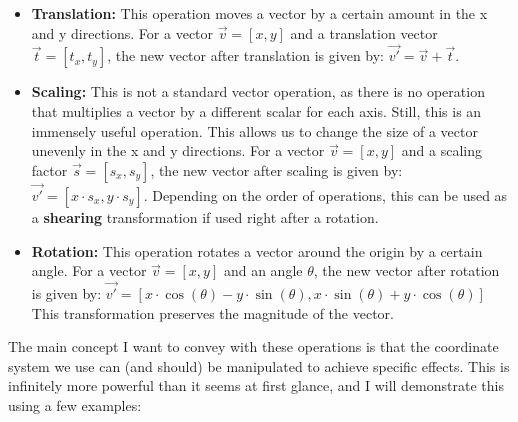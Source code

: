 \begin{itemize}
    \item \textbf{Translation:} This operation moves a vector by a certain amount in the x and y directions. For a vector \(\vec{v} = [x, y]\) and a translation vector \(\vec{t} = [t_x, t_y]\), the new vector after translation is given by: \(\vec{v'} = \vec{v} + \vec{t}\).

    \pagebreak

    \item \textbf{Scaling:} This is not a standard vector operation, as there is no operation that multiplies a vector by a different scalar for each axis. Still, this is an immensely useful operation. This allows us to change the size of a vector unevenly in the x and y directions. For a vector \(\vec{v} = [x, y]\) and a scaling factor \(\vec{s} = [s_x, s_y]\), the new vector after scaling is given by: \(\vec{v'} = [x \cdot s_x, y \cdot s_y]\). Depending on the order of operations, this can be used as a \textbf{shearing} transformation if used right after a rotation.

    \item \textbf{Rotation:} This operation rotates a vector around the origin by a certain angle. For a vector \(\vec{v} = [x, y]\) and an angle \(\theta\), the new vector after rotation is given by: \linebreak \(\vec{v'} = [x \cdot \cos(\theta) - y \cdot \sin(\theta), x \cdot \sin(\theta) + y \cdot \cos(\theta)]\) This transformation preserves the magnitude of the vector.
\end{itemize}

\vspace{5mm}

The main concept I want to convey with these operations is that the coordinate system we use can (and should) be manipulated to achieve specific effects. This is infinitely more powerful than it seems at first glance, and I will demonstrate this using a few examples:

